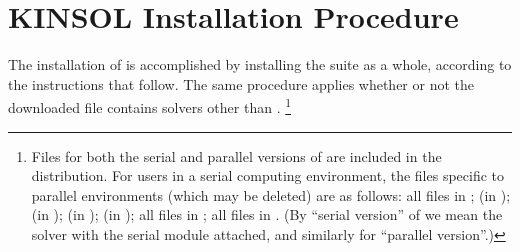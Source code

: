 \chapter{KINSOL Installation Procedure}\label{c:install}

The installation of {\kinsol} is accomplished by installing the
{\sundials} suite as a whole, according to the instructions that
follow. The same procedure applies whether or not the downloaded
file contains solvers other than {\kinsol}. \footnote{Files for both
the serial and parallel versions of {\kinsol} are included in the
distribution. For users in a serial computing environment, the files
specific to parallel environments (which may be deleted) are as follows:
all files in ;
 (in );
 (in );
 (in );
 (in );
all files in ;
all files in .
(By ``serial version'' of {\kinsol} we mean the {\kinsol} solver with the
serial {\nvector} module attached, and similarly for ``parallel version''.)}

